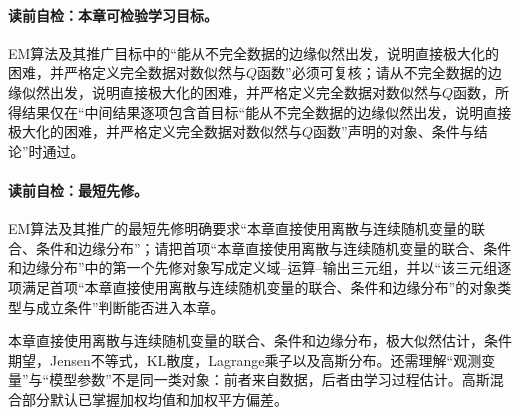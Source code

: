 \paragraph{读前自检：本章可检验学习目标。}EM算法及其推广目标中的“能从不完全数据的边缘似然出发，说明直接极大化的困难，并严格定义完全数据对数似然与$Q$函数”必须可复核；请从不完全数据的边缘似然出发，说明直接极大化的困难，并严格定义完全数据对数似然与$Q$函数，所得结果仅在“中间结果逐项包含首目标“能从不完全数据的边缘似然出发，说明直接极大化的困难，并严格定义完全数据对数似然与$Q$函数”声明的对象、条件与结论”时通过。\par


\label{struct:V3-C04-CH02}
\paragraph{读前自检：最短先修。}EM算法及其推广的最短先修明确要求“本章直接使用离散与连续随机变量的联合、条件和边缘分布”；请把首项“本章直接使用离散与连续随机变量的联合、条件和边缘分布”中的第一个先修对象写成定义域--运算--输出三元组，并以“该三元组逐项满足首项“本章直接使用离散与连续随机变量的联合、条件和边缘分布”的对象类型与成立条件”判断能否进入本章。\par

\begin{prerequisitebox}
本章直接使用离散与连续随机变量的联合、条件和边缘分布，极大似然估计，条件期望，Jensen不等式，KL散度，Lagrange乘子以及高斯分布。还需理解“观测变量”与“模型参数”不是同一类对象：前者来自数据，后者由学习过程估计。高斯混合部分默认已掌握加权均值和加权平方偏差。
\end{prerequisitebox}

